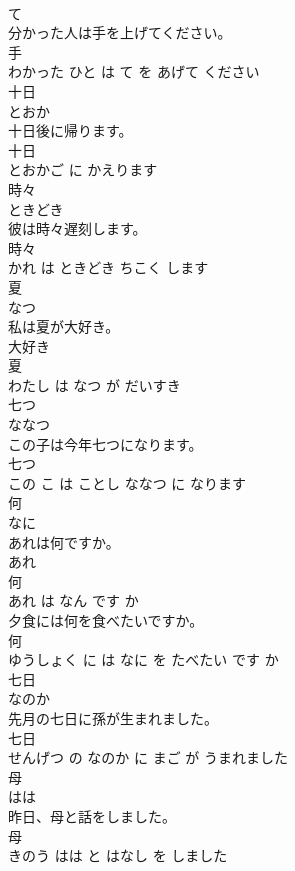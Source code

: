 \documentclass[8pt]{extreport}
\begin{document}
\begin{CJK}{UTF8}{min}
\\	て			
\\	分かった人は手を上げてください。	
\\	手 
\\	わかった ひと は て を あげて ください			
\\	十日	
\\	とおか			
\\	十日後に帰ります。	
\\	十日 
\\	とおかご に かえります			
\\	時々	
\\	ときどき			
\\	彼は時々遅刻します。	
\\	時々 
\\	かれ は ときどき ちこく します			
\\	夏	
\\	なつ			
\\	私は夏が大好き。	
\\	大好き 
\\	夏 
\\	わたし は なつ が だいすき			
\\	七つ	
\\	ななつ			
\\	この子は今年七つになります。	
\\	七つ 
\\	この こ は ことし ななつ に なります			
\\	何	
\\	なに			
\\	あれは何ですか。	
\\	あれ 
\\	何 
\\	あれ は なん です か			
\\	夕食には何を食べたいですか。	
\\	何 
\\	ゆうしょく に は なに を たべたい です か			
\\	七日	
\\	なのか			
\\	先月の七日に孫が生まれました。	
\\	七日 
\\	せんげつ の なのか に まご が うまれました			
\\	母	
\\	はは			
\\	昨日、母と話をしました。	
\\	母 
\\	きのう はは と はなし を しました			

\end{CJK}
\end{document}
